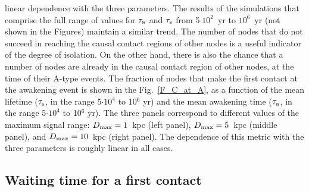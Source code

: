 \documentclass[crop]{CSLB}
\newcommand{\cetis}{nodes}
\begin{document}
linear dependence with the three parameters.
%
The results of the simulations that comprise the full range of values
for $\tau_{\rm a}$ and $\tau_{\rm s}$ from 5$\cdot10^2$~yr to
$10^6$~yr (not shown in the Figures) maintain a similar trend.
%
The number of \cetis{} that do not succeed in reaching the causal
contact regions of other nodes is a useful indicator of the degree of
isolation.
%
On the other hand, there is also the chance that a number of \cetis{}
are already in the causal contact region of other nodes, at the time
of their A-type events.
%
The fraction of \cetis{} that make the first contact at the awakening
event is shown in the Fig.~\ref{F_C_at_A}, as a function of the mean
lifetime ($\tau_{\rm s}$, in the range 5$\cdot 10^4$ to 10$^6$ yr) and
the mean awakening time ($\tau_{\rm a}$, in the range 5$\cdot 10^4$ to
10$^6$ yr).
%
The three panels correspond to different values of the maximum signal
range:
%
$D_{\rm max}=1$~kpc (left panel), $D_{\rm max}=5$~kpc (middle panel),
and $D_{\rm max}=10$~kpc (right panel).
%
The dependence of this metric with the three parameters is roughly
linear in all cases.



\subsection{Waiting time for a first contact}\label{SS_waiting}
\end{document}
